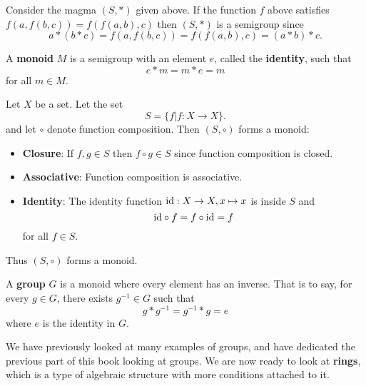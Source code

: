 \begin{example}
    Consider the magma $(S, \ast)$ given above. If the function $f$ above satisfies $f(a, f(b, c)) = f(f(a, b), c)$ then $(S, \ast)$ is a semigroup since
    \[
          a\ast(b\ast c) = f(a, f(b, c)) = f(f(a, b), c) = (a\ast b)\ast c.
    \]
\end{example}

\begin{definition}
    A \textbf{monoid} $M$ is a semigroup with an element $e$, called the \textbf{identity}, such that
    \[
        e \ast m = m \ast e = m
    \]
    for all $m \in M$.
\end{definition}

\begin{example}
    Let $X$ be a set. Let the set
    \[
        S = \{f \vert  f: X \to X\}.
    \]
    and let $\circ$ denote function composition. Then $(S, \circ)$ forms a monoid:
    \begin{itemize}
        \item \textbf{Closure}: If $f, g \in S$ then $f\circ g \in S$ since function composition is closed.
        \item \textbf{Associative}: Function composition is associative.
        \item \textbf{Identity}: The identity function $\mathrm{id}: X \to X, x\mapsto x$ is inside $S$ and
        \[
            \mathrm{id} \circ f = f \circ \mathrm{id} = f
        \]
        for all $f \in S$.
    \end{itemize}
    Thus $(S, \circ)$ forms a monoid.
\end{example}

\begin{definition}
    A \textbf{group} $G$ is a monoid where every element has an inverse. That is to say, for every $g \in G$, there exists $g^{-1} \in G$ such that
    \[
        g \ast g^{-1} = g^{-1} \ast g = e
    \]
    where $e$ is the identity in $G$.
\end{definition}
We have previously looked at many examples of groups, and have dedicated the previous part of this book looking at groups. We are now ready to look at \textbf{rings}, which is a type of algebraic structure with more conditions attached to it.

\newpage

